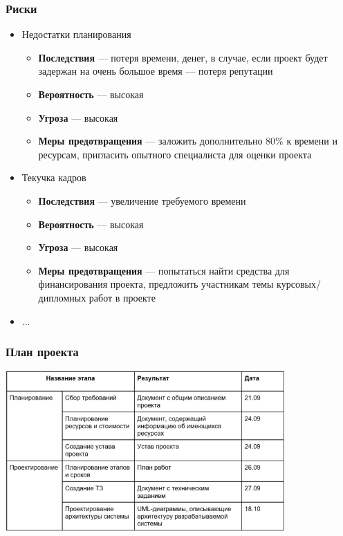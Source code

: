 \documentclass{../../slides-style}
\begin{document}
    \begin{frame}
        \frametitle{Риски}
        \begin{itemize}
            \item Недостатки планирования
            \begin{itemize}
                \item \textbf{Последствия} --- потеря времени, денег, в случае, если проект будет задержан на очень большое время --- потеря репутации
                \item \textbf{Вероятность} --- высокая
                \item \textbf{Угроза} --- высокая
                \item \textbf{Меры предотвращения} --- заложить дополнительно 80\% к времени и ресурсам, пригласить опытного специалиста для оценки проекта
            \end{itemize}
            \item Текучка кадров
            \begin{itemize}
                \item \textbf{Последствия} --- увеличение требуемого времени
                \item \textbf{Вероятность} --- высокая
                \item \textbf{Угроза} --- высокая
                \item \textbf{Меры предотвращения} --- попытаться найти средства для финансирования проекта, предложить участникам темы курсовых/дипломных работ в проекте
            \end{itemize}
            \item ...
        \end{itemize}
    \end{frame}

    \begin{frame}
        \frametitle{План проекта}
        \begin{center}
            \includegraphics[width=0.8\textwidth]{plan1.png}
        \end{center}
    \end{frame}
\end{document}

